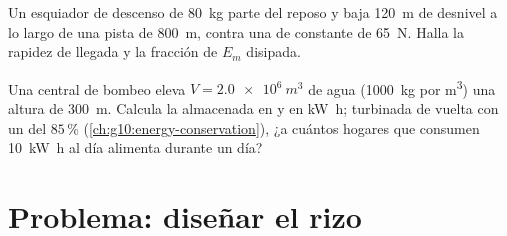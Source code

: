 \begin{exercise}[$\star\star\star$]\label{exo:g11:mechanical-energy:14}
Un esquiador de descenso de \qty{80}{kg} parte del reposo y baja
\qty{120}{m} de desnivel a lo largo de una pista de \qty{800}{m}, contra
una  de  constante de \qty{65}{N}. Halla la rapidez de
llegada y la fracción de $E_m$ disipada.
\end{exercise}

\begin{exercise}[$\star\star\star$]\label{exo:g11:mechanical-energy:15}
Una central de bombeo eleva $V = \qty{2.0e6}{m^3}$ de agua
(\qty{1000}{kg} por \unit{m^3}) una altura de \qty{300}{m}. Calcula la
 almacenada en  y en \unit{kW.h}; turbinada de vuelta con
un  del $85\,\%$ (\cref{ch:g10:energy-conservation}), ¿a
cuántos hogares que consumen \qty{10}{kW.h} al día alimenta durante un
día?
\end{exercise}

\section{Problema: diseñar el rizo}

